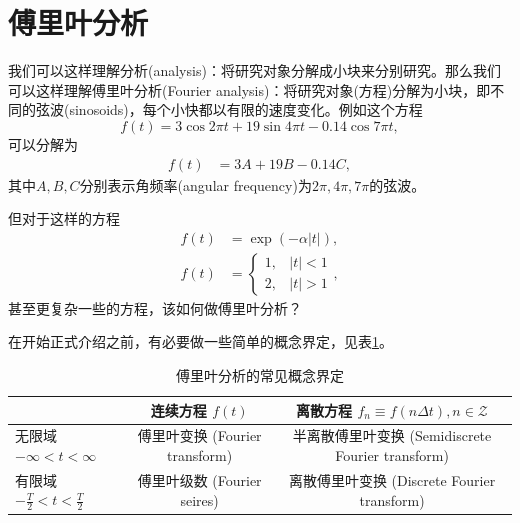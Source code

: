 \section{傅里叶分析}
\label{sec:fourier-analysis}

我们可以这样理解分析(analysis)：将研究对象分解成小块来分别研究。那么我们可以这样理解傅里叶分析(Fourier analysis)：将研究对象(方程)分解为小块，即不同的弦波(sinosoids)，每个小快都以有限的速度变化。例如这个方程
\begin{equation*}
  f(t) = 3 \cos 2 \pi t + 19 \sin 4\pi t - 0.14 \cos 7 \pi t,
\end{equation*}
可以分解为
\begin{equation*}
  \begin{split}
    f(t) & = 3 A + 19 B - 0.14 C,
  \end{split}
\end{equation*}
其中$A,B,C$分别表示角频率(angular frequency)为$2 \pi, 4 \pi, 7 \pi$的弦波。

但对于这样的方程
\begin{equation*}
\begin{split}
    f(t) &  = \exp \left( - \alpha \left| t \right| \right), \\
    f(t) & = \begin{cases}
    1, & \left| t \right| < 1 \\
    2, & \left| t \right| > 1
    \end{cases},
\end{split}
\end{equation*}
甚至更复杂一些的方程，该如何做傅里叶分析？

在开始正式介绍之前，有必要做一些简单的概念界定，见表\ref{tab:fourier-analysis-definition}。

\begin{table}[htbp]
\caption{傅里叶分析的常见概念界定}
\begin{tabular}{|l|c|c|}
\hline
 & 连续方程 $f(t)$ & 离散方程 $f_{n} \equiv f \left( n \Delta t \right), n \in \mathcal{Z}$\\ \hline
无限域 $- \infty < t < \infty$  & 傅里叶变换 (Fourier transform) \index{Fourier transform! \dotfill 傅里叶变换}& 半离散傅里叶变换 (Semidiscrete Fourier transform)\index{Fourier transform!Semidiscrete \dotfill 半离散傅里叶变换} \\ \hline
有限域 $- \frac{T}{2} < t < \frac{T}{2}$ & 傅里叶级数 (Fourier seires)\index{Fourier series \dotfill 傅里叶级数} & 离散傅里叶变换 (Discrete Fourier transform)\index{Fourier transform!Discrete \dotfill 离散傅里叶变换} \\ \hline
\end{tabular}
\label{tab:fourier-analysis-definition}
\end{table}

